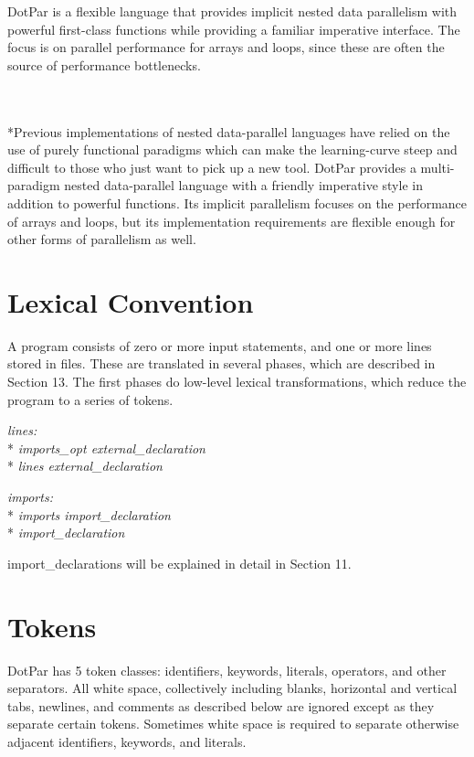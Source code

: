 DotPar is a flexible language that provides implicit nested data parallelism
with powerful first-class functions while providing a familiar imperative
interface. The focus is on parallel performance for arrays and loops, since
these are often the source of performance bottlenecks.

\\ \\*Previous implementations of nested data-parallel languages have relied on
the use of purely functional paradigms which can make the learning-curve steep
and difficult to those who just want to pick up a new tool. DotPar provides a
multi-paradigm nested data-parallel language with a friendly imperative style in
addition to powerful functions. Its implicit parallelism focuses on the
performance of arrays and loops, but its implementation requirements are
flexible enough for other forms of parallelism as well.

\section{Lexical Convention}
A program consists of zero or more input statements, and one or more lines
stored in files. These are translated in several phases, which are described in
Section 13. The first phases do low-level lexical transformations, which reduce
the program to a series of tokens.

\tab \emph{lines:} 
\\* \tab \tab \tab \textit{imports\_opt external\_declaration}
\\* \tab \tab \tab \emph{lines external\_declaration}

 \tab \emph{imports:}
\\* \tab \tab \tab \textit{imports import\_declaration}
\\* \tab \tab \tab \textit{import\_declaration}

import\_declarations will be explained in detail in Section 11.

\section{Tokens}
DotPar has 5 token classes: identifiers, keywords, literals, operators, and
other separators. All white space, collectively including blanks, horizontal and
vertical tabs, newlines, and comments as described below are ignored except as
they separate certain tokens. Sometimes white space is required to separate
otherwise adjacent identifiers, keywords, and literals.
